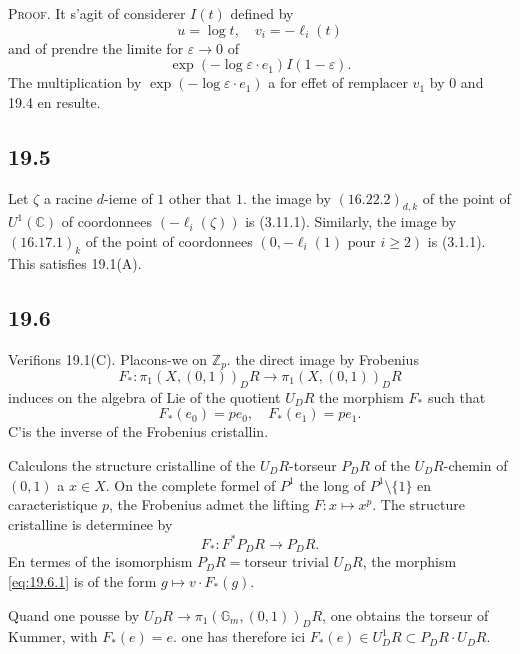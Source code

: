 \documentclass[12pt,a4paper]{article}
\theoremstyle{plain}
\theoremstyle{definition}
\theoremstyle{remark}
\newcommand{\dR}{DR}
\newcommand{\Gm}{\mathbb{G}_m}
\newcommand{\ZZ}{\mathbb{Z}}
\newcommand{\CC}{\mathbb{C}}
\begin{document}
\noindent \textsc{Proof.} It s'agit of considerer $I(t)$ defined by
\[
u = \log t, \quad v_i = -\ell_i(t)
\]
and of prendre the limite for $\varepsilon \to 0$ of
\[
\exp(-\log \varepsilon \cdot e_1) I(1-\varepsilon).
\]
The multiplication by $\exp(-\log \varepsilon \cdot e_1)$ a for effet
of remplacer $v_1$ by $0$ and 19.4 en resulte.

\subsection{19.5}

Let $\zeta$ a racine $d$-ieme of $1$ other that $1$. the image by
$(16.22.2)_{d,k}$ of the point of $U^1(\CC)$ of coordonnees
$(-\ell_i(\zeta))$ is (3.11.1). Similarly, the image by
$(16.17.1)_k$ of the point of coordonnees $(0, -\ell_i(1) \text{ pour }
i \geq 2)$ is (3.1.1). This satisfies 19.1(A).

\subsection{19.6}

Verifions 19.1(C). Placons-we on $\ZZ_p$. the direct image by
Frobenius
\[
F_* : \pi_1(X,(0,1))_\dR \to \pi_1(X,(0,1))_\dR
\]
induces on the algebra of Lie of the quotient $U_\dR$ the morphism $F_*$
such that
\[
F_*(e_0) = p e_0, \quad F_*(e_1) = p e_1.
\]
C'is the inverse of the Frobenius cristallin.

Calculons the structure cristalline of the $U_\dR$-torseur $P_\dR$ of the
$U_\dR$-chemin of $(0,1)$ a $x \in X$. On the complete formel of
$P^1$ the long of $P^1 \setminus \{1\}$ en caracteristique $p$, the
Frobenius admet the lifting $F : x \mapsto x^p$. The structure
cristalline is determinee by
\begin{equation}\label{eq:19.6.1}
F_* : F^* P_\dR \to P_\dR.
\end{equation}
En termes of the isomorphism $P_\dR = \text{torseur trivial } U_\dR$,
the morphism \eqref{eq:19.6.1} is of the form $g \mapsto v \cdot F_*(g)$.

Quand one pousse by $U_\dR \to \pi_1(\Gm,(0,1))_\dR$, one obtains the
torseur of Kummer, with $F_*(e) = e$. one has therefore ici $F_*(e) \in
U^1_\dR \subset P_\dR \cdot U_\dR$.
\end{document}
